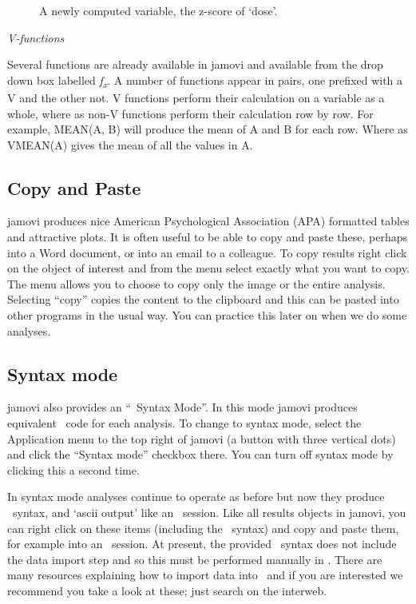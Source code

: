 \vspace*{1cm}
\begin{figure}[ht]
\begin{center}
\caption{A newly computed variable, the z-score of `dose'.}
\label{fig:computedvariable}
\end{center}
\end{figure}


{\it V-functions}

Several functions are already available in jamovi and available from the drop down box labelled {\it f\textsubscript{x}}. A number of functions appear in pairs, one prefixed with a V and the other not. V functions perform their calculation on a variable as a whole, where as non-V functions perform their calculation row by row. For example, MEAN(A, B) will produce the mean of A and B for each row. Where as VMEAN(A) gives the mean of all the values in A.

\subsection{Copy and Paste\label{sec:copypaste}}

jamovi produces nice American Psychological Association (APA) formatted tables and attractive plots. It is often useful to be able to copy and paste these, perhaps into a Word document, or into an email to a colleague. To copy results right click on the object of interest and from the menu select exactly what you want to copy. The menu allows you to choose to copy only the image or the entire analysis. Selecting ``copy'' copies the content to the clipboard and this can be pasted into other programs in the usual way. You can practice this later on when we do some analyses.

\subsection{Syntax mode\label{sec:syntaxmode}}

jamovi also provides an “\R\ Syntax Mode”. In this mode jamovi produces equivalent \R\ code for each analysis. To change to syntax mode, select the Application menu to the top right of jamovi (a button with three vertical dots) and click the “Syntax mode” checkbox there. You can turn off syntax mode by clicking this a second time.

In syntax mode analyses continue to operate as before but now they produce \R\ syntax, and `ascii output’ like an \R\ session. Like all results objects in jamovi, you can right click on these items (including the \R\ syntax) and copy and paste them, for example into an \R\ session. At present, the provided \R\ syntax does not include the data import step and so this must be performed manually in \R. There are many resources explaining how to import data into \R\ and if you are interested we recommend you take a look at these; just search on the interweb. 


